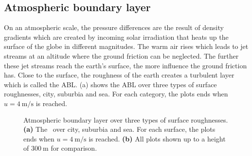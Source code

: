 \subsection{Atmospheric boundary layer}
\label{sec:atmABLbasics}

On an atmospheric scale, the pressure differences are the result of density gradients which are created by incoming solar irradiation that heats up the surface of the globe in different magnitudes.
The warm air rises which leads to jet streams at an altitude where the ground friction can be neglected.
The further these jet streams reach the earth's surface, the more influence the ground friction has. 
Close to the surface, the roughness of the earth creates a turbulent layer which is called the \gls{ABL}.
 (a) shows the \gls{ABL} over three types of surface roughnesses, city, suburbia and sea. For each category, the plots ends when $u = \SI{4}{\metre\per\second}$ is reached.



\begin{figure}[!bt]
	\captionsetup{format=plain}
	\caption[Atmospheric boundary layer over three types of surface roughnesses]{Atmospheric boundary layer over three types of surface roughnesses. \textbf{(a)} The \ABL\ over city, suburbia and sea. For each surface, the plots ends when $u = \SI{4}{\metre\per\second}$ is reached. \textbf{(b)} All plots shown up to a height of $\SI{300}{\metre}$ for comparison. }
	\label{fig:theory:ABL_example}
\end{figure}

